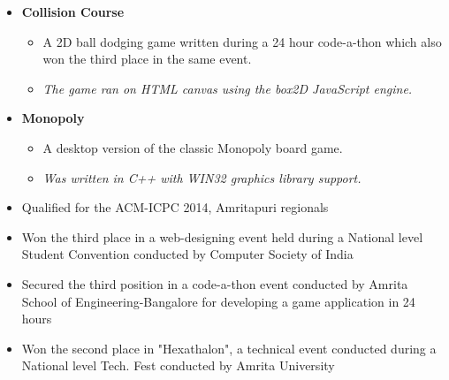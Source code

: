 \documentclass[letterpaper,11pt]{article}
\newcommand{\resitem}[1]{\item #1 \vspace{-2pt}}
\newcommand{\resheading}[1]{\textbf{\sffamily{\mbox{~}{\large #1} \vphantom{p\^{E}}}}}
\begin{document}
\begin{itemize}
\item[]
	\textbf{Collision Course}
	\vspace{-3mm}
	\begin{itemize}
		\resitem{A 2D ball dodging game written during a 24 hour code-a-thon which also won the third place in the same event.}
		\resitem{\textit{The game ran on HTML canvas using the box2D JavaScript engine.}}
	\end{itemize}

\item[]
	\textbf{Monopoly}
	\vspace{-3mm}
	\begin{itemize}
		\resitem{A desktop version of the classic Monopoly board game.}
		\resitem{\textit{Was written in C++ with WIN32 graphics library support.}}
	\end{itemize}

\end{itemize}

\resheading{Achievements}
\vspace{-3mm}
	\begin{itemize}
		\item Qualified for the ACM-ICPC 2014, Amritapuri regionals
		\vspace{-3mm}
		\item Won the third place in a web-designing event held during a National level Student Convention conducted by Computer Society of India
		\vspace{-3mm}
		\item Secured the third position in a code-a-thon event conducted by Amrita School of Engineering-Bangalore for developing a game application in 24 hours
		\vspace{-3mm}
		\item Won the second place in "Hexathalon", a technical event conducted during a National level Tech. Fest conducted by Amrita University
    \end{itemize}
\end{document}
